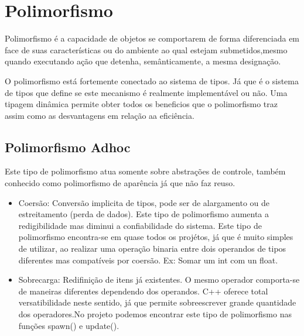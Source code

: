 \documentclass[rel_mlp]{iiufrgs}
\begin{document}
\section{Polimorfismo}
Polimorfismo é a capacidade de objetos se comportarem de forma diferenciada em face de suas características ou do ambiente ao qual estejam submetidos,mesmo quando executando ação que detenha, semânticamente, a mesma designação.

O polimorfismo está fortemente conectado ao sistema de tipos. Já que é o sistema de tipos que define se este mecanismo é realmente implementável ou não.  Uma tipagem dinâmica permite obter todos os beneficios que o polimorfismo traz assim como as desvantagens em relação aa eficiência. 

\subsection{Polimorfismo Adhoc} 
Este tipo de polimorfismo atua somente sobre abstrações de controle, também conhecido como polimorfismo de aparência já que não faz reuso.
\bigbreak
{}
 \begin{itemize}
	\item{ Coersão:  Conversão implicita de tipos, pode ser de alargamento ou de estreitamento (perda de dados). Este tipo de polimorfismo aumenta a redigibilidade mas diminui a confiabilidade do sistema.
Este tipo de polimorfismo encontra-se em quase todos os projétos, já que é muito simples de utilizar, ao realizar uma operação binaria entre dois operandos de tipos diferentes mas compatíveis por coersão. Ex: Somar um int com un float.
}
\item Sobrecarga: Redifinição de itens já existentes. O mesmo operador comporta-se de maneiras diferentes dependendo dos operandos. C++ oferece total versatibilidade neste sentido, já que permite sobreescrever grande quantidade dos operadores.No projeto podemos encontrar este tipo de polimorfismo nas funções spawn() e update().
 \end{itemize}  	
 
\end{document}
